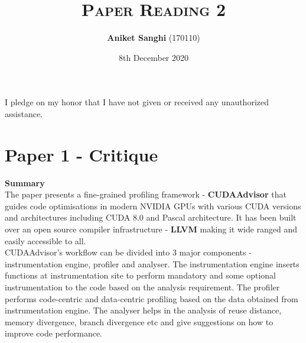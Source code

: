 \documentclass[a4paper]{article}
\title{\textsc{Paper Reading 2}}
\author{\textbf{Aniket Sanghi} (170110)}
\date{8th December 2020}
\begin{document}
\maketitle
\thispagestyle{fancy}
\fancyhead{}
\cfoot{\thepage}
\begin{center}
I pledge on my honor that I have not given or received any unauthorized assistance.\\
\end{center}

\section{Paper 1 - Critique} 
\vspace{0.5cm}
{\bf\Large Summary} \\

The paper presents a fine-grained profiling framework - {\bf CUDAAdvisor} that guides code optimisations in modern NVIDIA GPUs with various CUDA versions and architectures including CUDA 8.0 and Pascal architecture. It has been built over an open source compiler infrastructure - {\bf LLVM} making it wide ranged and easily accessible to all.\\

CUDAAdvisor's workflow can be divided into 3 major components - instrumentation engine, profiler and analyser. The instrumentation engine inserts functions at instrumentation site to perform mandatory and some optional instrumentation to the code based on the analysis requirement. The profiler performs code-centric and data-centric profiling based on the data obtained from instrumentation engine. The analyser helps in the analysis of reuse distance, memory divergence, branch divergence etc and give suggestions on how to improve code performance. \\
\end{document}
